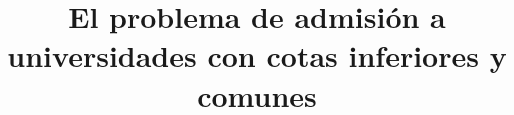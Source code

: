 \documentclass[11pt, oneside]{book}
\begin{document}


\renewcommand{\proofname}{Demostración}


\newtheorem{teo}{Teorema}[chapter] 
\newtheorem{cor}[teo]{Corolario}
\newtheorem{lem}[teo]{Lema}
\newcommand{\fin}{\hfill$\triangle$}

\theoremstyle{definition}
\newtheorem{dfn}[teo]{Definición}

\theoremstyle{remark}
\newtheorem{obs}[teo]{Observación}

\newtheorem{eje}{Ejemplo}[chapter]

\allowdisplaybreaks



\title{El problema de admisión a universidades con cotas inferiores y comunes} %
\end{document}
